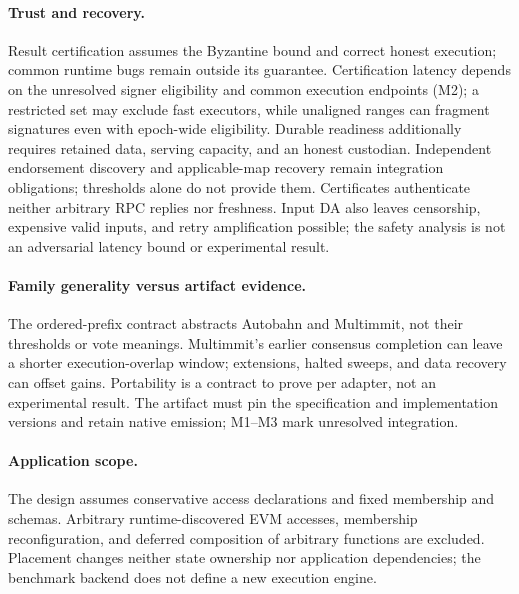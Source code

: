 \paragraph{Trust and recovery.}
Result certification assumes the Byzantine bound and correct honest execution; common runtime bugs remain outside its guarantee. Certification latency depends on the unresolved signer eligibility and common execution endpoints (M2); a restricted set may exclude fast executors, while unaligned ranges can fragment signatures even with epoch-wide eligibility. Durable readiness additionally requires retained data, serving capacity, and an honest custodian. Independent endorsement discovery and applicable-map recovery remain integration obligations; thresholds alone do not provide them. Certificates authenticate neither arbitrary RPC replies nor freshness. Input DA also leaves censorship, expensive valid inputs, and retry amplification possible; the safety analysis is not an adversarial latency bound or experimental result.

\paragraph{Family generality versus artifact evidence.}
The ordered-prefix contract abstracts Autobahn and Multimmit, not their thresholds or vote meanings. Multimmit's earlier consensus completion can leave a shorter execution-overlap window; extensions, halted sweeps, and data recovery can offset gains. Portability is a contract to prove per adapter, not an experimental result. The artifact must pin the specification and implementation versions and retain native emission; M1--M3 mark unresolved integration.

\paragraph{Application scope.}
The design assumes conservative access declarations and fixed membership and schemas. Arbitrary runtime-discovered EVM accesses, membership reconfiguration, and deferred composition of arbitrary functions are excluded. Placement changes neither state ownership nor application dependencies; the benchmark backend does not define a new execution engine.
